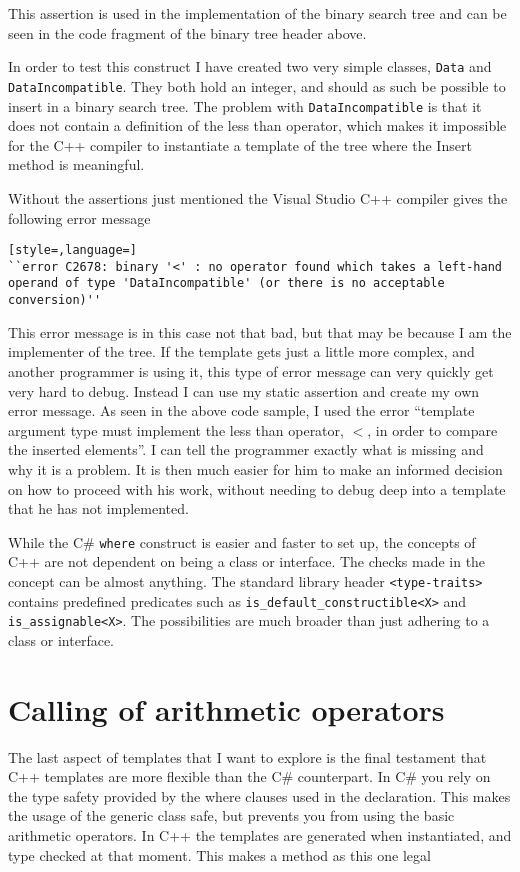 This assertion is used in the implementation of the binary search tree and can be seen in the code fragment of the binary tree header above.

In order to test this construct I have created two very simple classes, \lstinline|Data| and \lstinline|DataIncompatible|.
They both hold an integer, and should as such be possible to insert in a binary search tree.
The problem with \lstinline|DataIncompatible| is that it does not contain a definition of the less than operator, which makes it impossible for the C++ compiler to instantiate a template of the tree where the Insert method is meaningful.

Without the assertions just mentioned the Visual Studio C++ compiler gives the following error message 

\begin{lstlisting}[style=,language=]
``error C2678: binary '<' : no operator found which takes a left-hand operand of type 'DataIncompatible' (or there is no acceptable conversion)''
\end{lstlisting}

This error message is in this case not that bad, but that may be because I am the implementer of the tree.
If the template gets just a little more complex, and another programmer is using it, this type of error message can very quickly get very hard to debug.
Instead I can use my static assertion and create my own error message. 
As seen in the above code sample, I used the error ``template argument type must implement the less than operator, $ < $, in order to compare the inserted elements''.
I can tell the programmer exactly what is missing and why it is a problem.
It is then much easier for him to make an informed decision on how to proceed with his work, without needing to debug deep into a template that he has not implemented.

While the C\# \texttt{where} construct is easier and faster to set up, the concepts of C++ are not dependent on being a class or interface. 
The checks made in the concept can be almost anything.
The standard library header \lstinline|<type-traits>| contains predefined predicates such as \lstinline|is_default_constructible<X>| and \lstinline|is_assignable<X>|.
The possibilities are much broader than just adhering to a class or interface.

\section{Calling of arithmetic operators}
The last aspect of templates that I want to explore is the final testament that C++ templates are more flexible than the C\# counterpart.
In C\# you rely on the type safety provided by the where clauses used in the declaration.
This makes the usage of the generic class safe, but prevents you from using the basic arithmetic operators. 
In C++ the templates are generated when instantiated, and type checked at that moment.
This makes a method as this one legal

